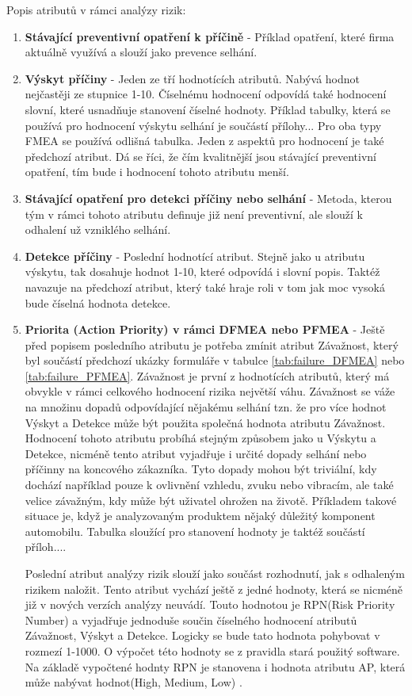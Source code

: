 Popis atributů v rámci analýzy rizik:
\begin{enumerate}
	\item \textbf{Stávající preventivní opatření k příčině} - Příklad opatření, které firma aktuálně využívá a slouží jako prevence selhání. 
	\item \textbf{Výskyt příčiny} - Jeden ze tří hodnotících atributů. Nabývá hodnot nejčastěji ze stupnice 1-10. Číselnému hodnocení odpovídá také hodnocení slovní, které usnadňuje stanovení číselné hodnoty. Příklad tabulky, která se používá pro hodnocení výskytu selhání je součástí přílohy... Pro oba typy FMEA se používá odlišná tabulka. Jeden z aspektů pro hodnocení je také předchozí atribut. Dá se říci, že čím kvalitnější jsou stávající preventivní opatření, tím bude i hodnocení tohoto atributu menší.     
	\item \textbf{Stávající opatření pro detekci příčiny nebo selhání} - Metoda, kterou tým v rámci tohoto atributu definuje již není preventivní, ale slouží k odhalení už vzniklého selhání. 
	\item \textbf{Detekce příčiny} - Poslední hodnotící atribut. Stejně jako u atributu výskytu, tak dosahuje hodnot 1-10, které odpovídá i slovní popis. Taktéž navazuje na předchozí atribut, který také hraje roli v tom jak moc vysoká bude číselná hodnota detekce. 
	\item \textbf{Priorita (Action Priority) v rámci DFMEA nebo PFMEA} - 
 Ještě před popisem posledního atributu je potřeba zmínit atribut Závažnost, který byl součástí předchozí ukázky formuláře v tabulce \ref{tab:failure_DFMEA} nebo \ref{tab:failure_PFMEA}. Závažnost je první z hodnotících atributů, který má obvykle v rámci celkového hodnocení rizika největší váhu. Závažnost se váže na množinu dopadů odpovídající nějakému selhání tzn. že pro více hodnot Výskyt a Detekce může být použita společná hodnota atributu Závažnost. Hodnocení tohoto atributu probíhá stejným způsobem jako u Výskytu a Detekce, nicméně tento atribut vyjadřuje i určité dopady selhání nebo příčinny na koncového zákazníka. Tyto dopady mohou být triviální, kdy dochází například pouze k ovlivnění vzhledu, zvuku nebo vibracím, ale také velice závažným, kdy může být uživatel ohrožen na životě. Příkladem takové situace je, když je analyzovaným produktem nějaký důležitý komponent automobilu. Tabulka sloužící pro stanovení hodnoty je taktéž součástí příloh....
 
 Poslední atribut analýzy rizik slouží jako součást rozhodnutí, jak s odhaleným rizikem naložit. Tento atribut vychází ještě z jedné hodnoty, která se nicméně již v nových verzích analýzy neuvádí. Touto hodnotou je RPN(Risk Priority Number) a vyjadřuje jednoduše součin číselného hodnocení atributů Závažnost, Výskyt a Detekce. Logicky se bude tato hodnota pohybovat v rozmezí 1-1000. O výpočet této hodnoty se z pravidla stará použitý software. Na základě vypočtené hodnty RPN je stanovena i hodnota atributu AP, která může nabývat hodnot(High, Medium, Low) .


\end{enumerate}

